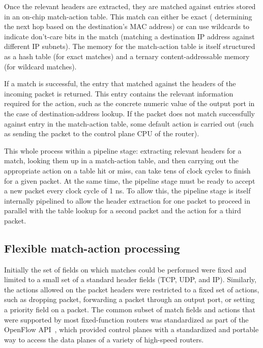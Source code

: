 Once the relevant headers are extracted, they are matched against entries
stored in an on-chip match-action table. This match can either be exact (\eg
determining the next hop based on the destination's MAC address) or can use
wildcards to indicate don't-care bits in the match (\eg matching a destination
IP address against different IP subnets). The memory for the match-action table
is itself structured as a hash table (for exact matches) and a ternary
content-addressable memory (for wildcard matches).

If a match is successful, the entry that matched against the headers of the
incoming packet is returned. This entry contains the relevant information
required for the action, such as the concrete numeric value of the output port
in the case of destination-address lookup. If the packet does not match
successfully against entry in the match-action table, some default action is
carried out (such as sending the packet to the control plane CPU of the
router).

This whole process within a pipeline stage: extracting relevant headers for a
match, looking them up in a match-action table, and then carrying out the
appropriate action on a table hit or miss, can take tens of clock cycles to
finish for a given packet. At the same time, the pipeline stage must be ready
to accept a new packet every clock cycle of 1 ns. To allow this, the pipeline
stage is itself internally pipelined to allow the header extraction for one
packet to proceed in parallel with the table lookup for a second packet and the
action for a third packet.

\subsection{Flexible match-action processing}
Initially the set of fields on which matches could be performed were fixed and
limited to a small set of a standard header fields (\eg TCP, UDP, and IP).
Similarly, the actions allowed on the packet headers were restricted to a fixed
set of actions, such as dropping packet, forwarding a packet through an output
port, or setting a priority field on a packet. The common subset of match
fields and actions that were supported by most fixed-function routers was
standardized as part of the OpenFlow API~\cite{openflow}, which provided
control planes with a standardized and portable way to access the data planes
of a variety of high-speed routers.


